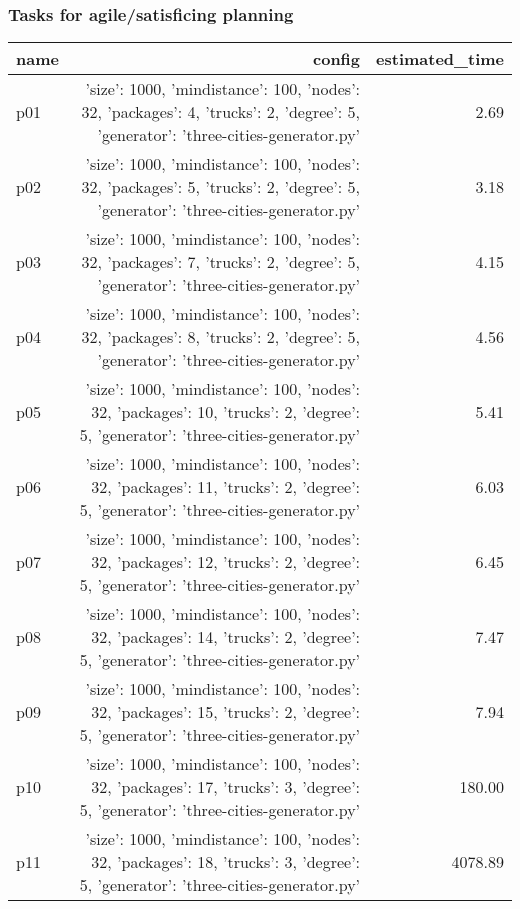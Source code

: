 \documentclass{article}
\begin{document}
                                \subsubsection*{Tasks for agile/satisficing planning}
                                
                            \begin{center}
                            \scriptsize
                            \begin{tabular}{@{}l|r|r@{}}
                            name & config & estimated\_time\\\midrule
                              p01&{'size': 1000, 'mindistance': 100, 'nodes': 32, 'packages': 4, 'trucks': 2, 'degree': 5, 'generator': 'three-cities-generator.py'}&2.69\\
  p02&{'size': 1000, 'mindistance': 100, 'nodes': 32, 'packages': 5, 'trucks': 2, 'degree': 5, 'generator': 'three-cities-generator.py'}&3.18\\
  p03&{'size': 1000, 'mindistance': 100, 'nodes': 32, 'packages': 7, 'trucks': 2, 'degree': 5, 'generator': 'three-cities-generator.py'}&4.15\\
  p04&{'size': 1000, 'mindistance': 100, 'nodes': 32, 'packages': 8, 'trucks': 2, 'degree': 5, 'generator': 'three-cities-generator.py'}&4.56\\
  p05&{'size': 1000, 'mindistance': 100, 'nodes': 32, 'packages': 10, 'trucks': 2, 'degree': 5, 'generator': 'three-cities-generator.py'}&5.41\\
  p06&{'size': 1000, 'mindistance': 100, 'nodes': 32, 'packages': 11, 'trucks': 2, 'degree': 5, 'generator': 'three-cities-generator.py'}&6.03\\
  p07&{'size': 1000, 'mindistance': 100, 'nodes': 32, 'packages': 12, 'trucks': 2, 'degree': 5, 'generator': 'three-cities-generator.py'}&6.45\\
  p08&{'size': 1000, 'mindistance': 100, 'nodes': 32, 'packages': 14, 'trucks': 2, 'degree': 5, 'generator': 'three-cities-generator.py'}&7.47\\
  p09&{'size': 1000, 'mindistance': 100, 'nodes': 32, 'packages': 15, 'trucks': 2, 'degree': 5, 'generator': 'three-cities-generator.py'}&7.94\\
  p10&{'size': 1000, 'mindistance': 100, 'nodes': 32, 'packages': 17, 'trucks': 3, 'degree': 5, 'generator': 'three-cities-generator.py'}&180.00\\
  p11&{'size': 1000, 'mindistance': 100, 'nodes': 32, 'packages': 18, 'trucks': 3, 'degree': 5, 'generator': 'three-cities-generator.py'}&4078.89\\

\end{tabular}
\end{center}
\end{document}
